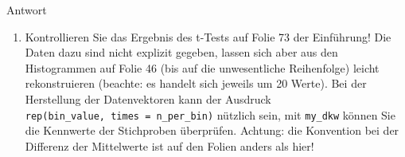 \documentclass[
]{book}
\newenvironment{Shaded}{\begin{snugshade}}{\end{snugshade}}
\newcommand{\ControlFlowTok}[1]{\textcolor[rgb]{0.13,0.29,0.53}{\textbf{#1}}}
\newcommand{\DecValTok}[1]{\textcolor[rgb]{0.00,0.00,0.81}{#1}}
\newcommand{\FunctionTok}[1]{\textcolor[rgb]{0.00,0.00,0.00}{#1}}
\newcommand{\NormalTok}[1]{#1}
\newcommand{\OtherTok}[1]{\textcolor[rgb]{0.56,0.35,0.01}{#1}}
\newcommand{\SpecialCharTok}[1]{\textcolor[rgb]{0.00,0.00,0.00}{#1}}
\providecommand{\tightlist}{%
  \setlength{\itemsep}{0pt}\setlength{\parskip}{0pt}}
\begin{document}
Antwort

\begin{Shaded}
\end{Shaded}

\begin{enumerate}
\def\labelenumi{(\arabic{enumi})}
\setcounter{enumi}{1}
\tightlist
\item
  Kontrollieren Sie das Ergebnis des t-Tests auf Folie 73 der Einführung! Die Daten dazu sind nicht explizit gegeben, lassen sich aber aus den Histogrammen auf Folie 46 (bis auf die unwesentliche Reihenfolge) leicht rekonstruieren (beachte: es handelt sich jeweils um 20 Werte). Bei der Herstellung der Datenvektoren kann der Ausdruck \texttt{rep(bin\_value,\ times\ =\ n\_per\_bin)} nützlich sein, mit \texttt{my\_dkw} können Sie die Kennwerte der Stichproben überprüfen. Achtung: die Konvention bei der Differenz der Mittelwerte ist auf den Folien anders als hier!
\end{enumerate}
\end{document}
